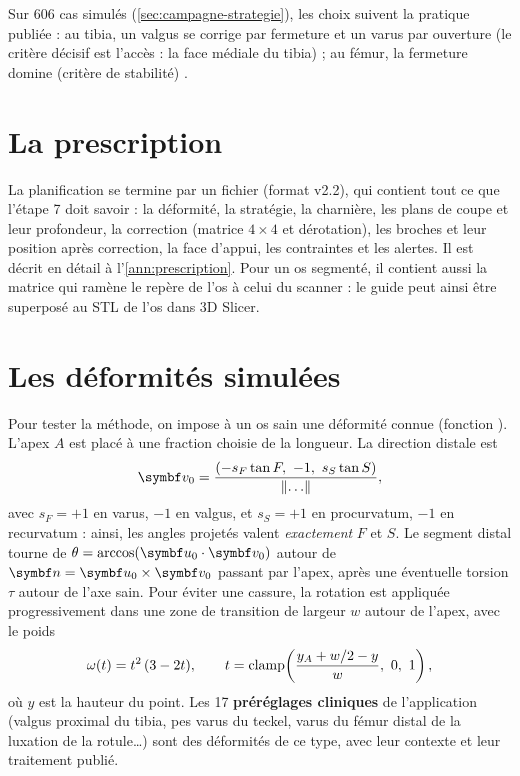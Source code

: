 
\begin{exemple}
Sur 606 cas simulés (\cref{sec:campagne-strategie}), les choix suivent la pratique publiée : au tibia, un valgus se
corrige par fermeture et un varus par ouverture (le critère décisif est l'accès : la face médiale du tibia) ; au fémur,
la fermeture domine (critère de stabilité) \cite{petazzoni2012,brower2017}.
\end{exemple}

\section{La prescription}

La planification se termine par un fichier  (format v2.2), qui contient tout ce que l'étape
7 doit savoir : la déformité, la stratégie, la charnière, les plans de coupe et leur profondeur, la correction (matrice
$4 \times 4$ et dérotation), les broches et leur position après correction, la face d'appui, les contraintes et les
alertes. Il est décrit en détail à l'\cref{ann:prescription}. Pour un os segmenté, il contient aussi la matrice qui
ramène le repère de l'os à celui du scanner : le guide peut ainsi être superposé au STL de l'os dans 3D Slicer.

\section{Les déformités simulées}
\label{sec:deformite-simulee}

Pour tester la méthode, on impose à un os sain une déformité connue (fonction ). L'apex $A$ est
placé à une fraction choisie de la longueur. La direction distale est
\begin{equation}
  \vb{v}_0 = \frac{(-s_F\tan F,\ -1,\ s_S\tan S)}{\norm{\ldots}},
\end{equation}
avec $s_F = +1$ en varus, $-1$ en valgus, et $s_S = +1$ en procurvatum, $-1$ en recurvatum : ainsi, les angles projetés
valent \emph{exactement} $F$ et $S$. Le segment distal tourne de $\theta = \arccos(\vb{u}_0\cdot\vb{v}_0)$ autour de
$\vb{n} = \vb{u}_0\times\vb{v}_0$ passant par l'apex, après une éventuelle torsion $\tau$ autour de l'axe sain. Pour
éviter une cassure, la rotation est appliquée progressivement dans une zone de transition de largeur $w$ autour de
l'apex, avec le poids
\begin{equation}
  \omega(t) = t^2\,(3 - 2t), \qquad t = \clamp\!\left(\frac{y_A + w/2 - y}{w},\ 0,\ 1\right),
\end{equation}
où $y$ est la hauteur du point. Les 17 \textbf{préréglages cliniques} de l'application (valgus proximal du tibia, pes
varus du teckel, varus du fémur distal de la luxation de la rotule\ldots) sont des déformités de ce type, avec leur
contexte et leur traitement publié.

